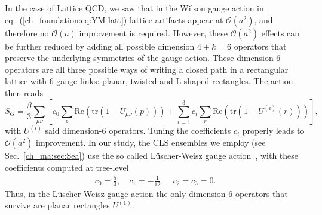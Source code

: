 In the case of Lattice QCD, we saw that in the Wilson gauge action in eq.~(\ref{ch_foundation:eq:YM-latt}) lattice artifacts appear at $\mathcal{O}(a^2)$, and therefore no $\mathcal{O}(a)$ improvement is required. However, these $\mathcal{O}(a^2)$ effects can be further reduced by adding all possible dimension $4+k=6$ operators that preserve the underlying symmetries of the gauge action. These dimension-6 operators are all three possible ways of writing a closed path in a rectangular lattice with 6 gauge links: planar, twisted and L-shaped rectangles. The action then reads
\begin{equation}
\label{ch_foundation:eq:SG_impr}
S_G=\frac{\beta}{3}\sum_{\mu\nu}\left[c_0\sum_p{\textrm{Re}}\left({\textrm{tr}}\left(1-U_{\mu\nu}(p)\right)\right)+\sum_{i=1}^3c_i\sum_r{\textrm{Re}}\left({\textrm{tr}}\left(1-U^{(i)}(r)\right)\right)\right],
\end{equation}
with $U^{(i)}$ said dimension-6 operators. Tuning the coefficients $c_i$ properly leads to $\mathcal{O}(a^2)$ improvement. In our study, the CLS ensembles we employ (see Sec.~\ref{ch_ma:sec:Sea}) use the so called Lüscher-Weisz gauge action~\citep{Luscher:1984xn,Luscher:1985zq}, with these coefficients computed at tree-level
\begin{gather}
\label{ch_foundation:eq:LW}
c_0=\frac{5}{3}, \quad
c_1=-\frac{1}{12}, \quad
c_2=c_3=0.
\end{gather}
Thus, in the Lüscher-Weisz gauge action the only dimension-6 operators that survive are planar rectangles $U^{(1)}$.

